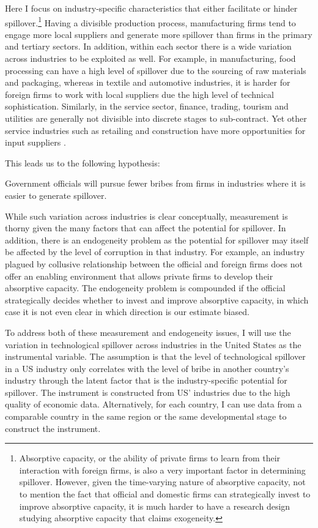 Here I focus on industry-specific characteristics that either facilitate or hinder spillover.\footnote{Absorptive capacity, or the ability of private firms to learn from their interaction with foreign firms, is also a very important factor in determining spillover. However, given the time-varying nature of absorptive capacity, not to mention the fact that official and domestic firms can strategically invest to improve absorptive capacity, it is much harder to have a research design studying absorptive capacity that claims exogeneity.} Having a divisible production process, manufacturing firms tend to engage more local suppliers and generate more spillover than firms in the primary and tertiary sectors. In addition, within each sector there is a wide variation across industries to be exploited as well. For example, in manufacturing, food processing can have a high level of spillover due to the sourcing of raw materials and packaging, whereas in textile and automotive industries, it is harder for foreign firms to work with local suppliers due the high level of technical sophistication. Similarly, in the service sector, finance, trading, tourism and utilities are generally not divisible into discrete stages to sub-contract. Yet other service industries such as retailing and construction have more opportunities for input suppliers \citep[138]{UNCTAD2001}.

This leads us to the following hypothesis:

\begin{hyp}
Government officials will pursue fewer bribes from firms in industries where it is easier to generate spillover.
\end{hyp}

While such variation across industries is clear conceptually, measurement is thorny given the many factors that can affect the potential for spillover. In addition, there is an endogeneity problem as the potential for spillover may itself be affected by the level of corruption in that industry. For example, an industry plagued by collusive relationship between the official and foreign firms does not offer an enabling environment that allows private firms to develop their absorptive capacity. The endogeneity problem is compounded if the official strategically decides whether to invest and improve absorptive capacity, in which case it is not even clear in which direction is our estimate biased.

To address both of these measurement and endogeneity issues, I will use the variation in technological spillover across industries in the United States as the instrumental variable. The assumption is that the level of technological spillover in a US industry only correlates with the level of bribe in another country's industry through the latent factor that is the industry-specific potential for spillover. The instrument is constructed from US' industries due to the high quality of economic data. Alternatively, for each country, I can use data from a comparable country in the same region or the same developmental stage to construct the instrument.

